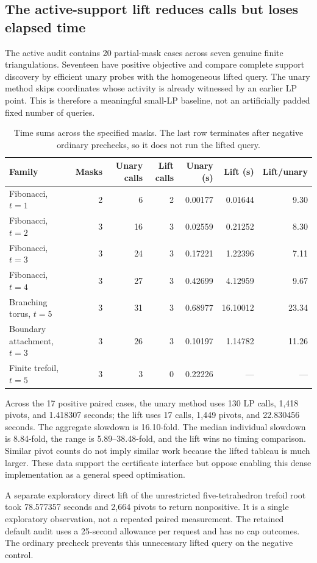\subsection{The active-support lift reduces calls but loses elapsed time}

The active audit contains 20 partial-mask cases across seven genuine finite
triangulations. Seventeen have positive objective and compare complete
support discovery by efficient unary probes with the homogeneous lifted
query. The unary method skips coordinates whose activity is already
witnessed by an earlier LP point. This is therefore a meaningful small-LP
baseline, not an artificially padded fixed number of queries.

\begin{table}[htbp]
\centering\small
\begin{tabular}{lrrrrrr}
\toprule
Family & Masks & Unary calls & Lift calls & Unary (s) & Lift (s) & Lift/unary\\
\midrule
Fibonacci, $t=1$ &2&6&2&0.00177&0.01644&9.30\\
Fibonacci, $t=2$ &3&16&3&0.02559&0.21252&8.30\\
Fibonacci, $t=3$ &3&24&3&0.17221&1.22396&7.11\\
Fibonacci, $t=4$ &3&27&3&0.42699&4.12959&9.67\\
Branching torus, $t=5$ &3&31&3&0.68977&16.10012&23.34\\
Boundary attachment, $t=3$ &3&26&3&0.10197&1.14782&11.26\\
Finite trefoil, $t=5$ &3&3&0&0.22226&---&---\\
\bottomrule
\end{tabular}
\caption{Time sums across the specified masks. The last row terminates
after negative ordinary prechecks, so it does not run the lifted query.}
\label{tab:active-timing}
\end{table}

Across the 17 positive paired cases, the unary method uses 130 LP calls,
1,418 pivots, and 1.418307 seconds; the lift uses 17 calls, 1,449 pivots,
and 22.830456 seconds. The aggregate slowdown is 16.10-fold. The median
individual slowdown is 8.84-fold, the range is 5.89--38.48-fold, and the
lift wins no timing comparison. Similar pivot counts do not imply similar
work because the lifted tableau is much larger. These data support the
certificate interface but oppose enabling this dense implementation as a
general speed optimisation.

A separate exploratory direct lift of the unrestricted five-tetrahedron
trefoil root took 78.577357 seconds and 2,664 pivots to return nonpositive.
It is a single exploratory observation, not a repeated paired measurement.
The retained default audit uses a 25-second allowance per request and has
no cap outcomes. The ordinary precheck prevents this unnecessary lifted
query on the negative control.

